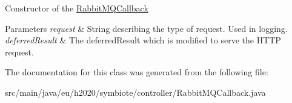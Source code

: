 Constructor of the \hyperlink{classeu_1_1h2020_1_1symbiote_1_1controller_1_1RabbitMQCallback}{Rabbit\+M\+Q\+Callback}


\begin{DoxyParams}{Parameters}
{\em request} & String describing the type of request. Used in logging. \\
\hline
{\em deferred\+Result} & The deferred\+Result which is modified to serve the H\+T\+TP request. \\
\hline
\end{DoxyParams}


The documentation for this class was generated from the following file\+:\begin{DoxyCompactItemize}
\item 
src/main/java/eu/h2020/symbiote/controller/Rabbit\+M\+Q\+Callback.\+java\end{DoxyCompactItemize}
